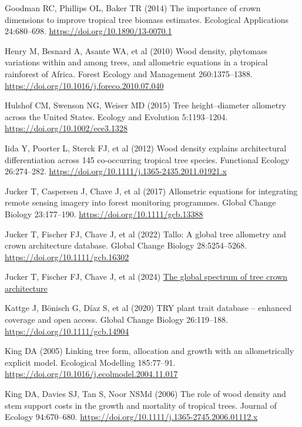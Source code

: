 \documentclass[
  12pt,
  letterpaper,
  DIV=11,
  numbers=noendperiod]{scrartcl}
\newlength{\cslhangindent}
\newenvironment{CSLReferences}[2] %
 {\begin{list}{}{%
  \setlength{\itemindent}{0pt}
  \setlength{\leftmargin}{0pt}
  \setlength{\parsep}{0pt}
  \ifodd #1
   \setlength{\leftmargin}{\cslhangindent}
   \setlength{\itemindent}{-1\cslhangindent}
  \fi
  \setlength{\itemsep}{#2\baselineskip}}}
 {\end{list}}
\begin{document}
\begin{CSLReferences}{1}{1}
Goodman RC, Phillips OL, Baker TR (2014) The importance of crown
dimensions to improve tropical tree biomass estimates. Ecological
Applications 24:680--698. \url{https://doi.org/10.1890/13-0070.1}

Henry M, Besnard A, Asante WA, et al (2010) Wood density, phytomass
variations within and among trees, and allometric equations in a
tropical rainforest of {Africa}. Forest Ecology and Management
260:1375--1388. \url{https://doi.org/10.1016/j.foreco.2010.07.040}

Hulshof CM, Swenson NG, Weiser MD (2015) Tree height--diameter allometry
across the {United} {States}. Ecology and Evolution 5:1193--1204.
\url{https://doi.org/10.1002/ece3.1328}

Iida Y, Poorter L, Sterck FJ, et al (2012) Wood density explains
architectural differentiation across 145 co-occurring tropical tree
species. Functional Ecology 26:274--282.
\url{https://doi.org/10.1111/j.1365-2435.2011.01921.x}

Jucker T, Caspersen J, Chave J, et al (2017) Allometric equations for
integrating remote sensing imagery into forest monitoring programmes.
Global Change Biology 23:177--190.
\url{https://doi.org/10.1111/gcb.13388}

Jucker T, Fischer FJ, Chave J, et al (2022) Tallo: {A} global tree
allometry and crown architecture database. Global Change Biology
28:5254--5268. \url{https://doi.org/10.1111/gcb.16302}

Jucker T, Fischer FJ, Chave J, et al (2024)
\href{https://doi.org/10.1101/2024.09.14.613032}{The global spectrum of
tree crown architecture}

Kattge J, Bönisch G, Díaz S, et al (2020) {TRY} plant trait database --
enhanced coverage and open access. Global Change Biology 26:119--188.
\url{https://doi.org/10.1111/gcb.14904}

King DA (2005) Linking tree form, allocation and growth with an
allometrically explicit model. Ecological Modelling 185:77--91.
\url{https://doi.org/10.1016/j.ecolmodel.2004.11.017}

King DA, Davies SJ, Tan S, Noor NSMd (2006) The role of wood density and
stem support costs in the growth and mortality of tropical trees.
Journal of Ecology 94:670--680.
\url{https://doi.org/10.1111/j.1365-2745.2006.01112.x}


\end{CSLReferences}
\end{document}
